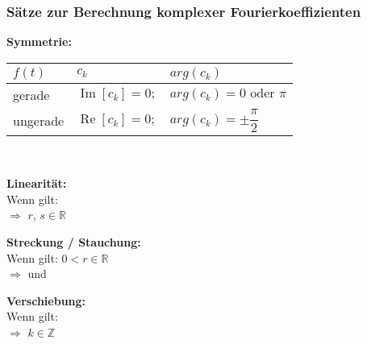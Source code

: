 			\subsubsection{Sätze zur Berechnung komplexer Fourierkoeffizienten}
				\begin{minipage}[t]{0.5\textwidth}
					\textbf{Symmetrie:}\\[3pt]
					\begin{tabular}{|l|l|l|}
						\hline
						$f(t)$ & $c_k$ & $arg(c_k)$\\[3pt]
						\hline
						gerade & $\displaystyle \operatorname{Im}[c_k] = 0 ;$ & $\displaystyle arg(c_k) = 0 \text{ oder } \pi$\\[3pt]
						\hline
						ungerade & $\displaystyle \operatorname{Re}[c_k] = 0 ;$ & $\displaystyle arg(c_k) = \pm \dfrac{\pi}{2}$\\[3pt]
						\hline
					\end{tabular}\\[6pt]
				\end{minipage}
				\begin{minipage}[t]{0.5\textwidth}
					\textbf{Linearität:}\\[3pt]
					Wenn gilt: \\[3pt]
					$\Rightarrow$  $r$, $s \in \mathbb{R}$\\[6pt]
				\end{minipage}
				\begin{minipage}[t]{0.5\textwidth}
					\textbf{Streckung / Stauchung:}\\[3pt]
					Wenn gilt:  $0 < r \in \mathbb{R}$\\[3pt]
					$\Rightarrow$  und 
				\end{minipage}
				\begin{minipage}[t]{0.5\textwidth}
					\textbf{Verschiebung:}\\[3pt]
					Wenn gilt: \\[3pt]
					$\Rightarrow$  $k \in \mathbb{Z}$
				\end{minipage}
			
